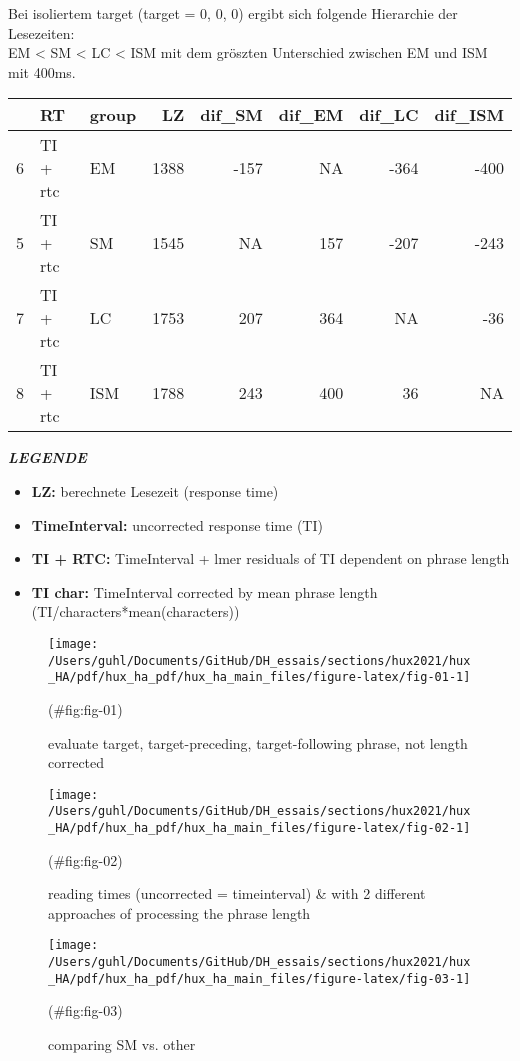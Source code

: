 \documentclass[
]{article}
\providecommand{\tightlist}{%
  \setlength{\itemsep}{0pt}\setlength{\parskip}{0pt}}
\begin{document}
Bei isoliertem target (target = 0, 0, 0) ergibt sich folgende Hierarchie der Lesezeiten:\\
EM \textless{} SM \textless{} LC \textless{} ISM mit dem gröszten Unterschied zwischen EM und ISM mit 400ms.

\begin{tabular}{l|l|l|r|r|r|r|r}
\hline
  & RT & group & LZ & dif\_SM & dif\_EM & dif\_LC & dif\_ISM\\
\hline
6 & TI + rtc & EM & 1388 & -157 & NA & -364 & -400\\
\hline
5 & TI + rtc & SM & 1545 & NA & 157 & -207 & -243\\
\hline
7 & TI + rtc & LC & 1753 & 207 & 364 & NA & -36\\
\hline
8 & TI + rtc & ISM & 1788 & 243 & 400 & 36 & NA\\
\hline
\end{tabular}

\textbf{\emph{LEGENDE}}

\begin{itemize}
\tightlist
\item
  \textbf{LZ:} berechnete Lesezeit (response time)
\item
  \textbf{TimeInterval:} uncorrected response time (TI)\\
\item
  \textbf{TI + RTC:} TimeInterval + lmer residuals of TI dependent on phrase length\\
\item
  \textbf{TI char:} TimeInterval corrected by mean phrase length (TI/characters*mean(characters))
\end{itemize}

\begin{figure}[H]
\texttt{[image: /Users/guhl/Documents/GitHub/DH\_essais/sections/hux2021/hux\_HA/pdf/hux\_ha\_pdf/hux\_ha\_main\_files/figure-latex/fig-01-1]} \caption{evaluate target, target-preceding, target-following phrase, not length corrected}(\#fig:fig-01)
\end{figure}

\begin{figure}[H]
\texttt{[image: /Users/guhl/Documents/GitHub/DH\_essais/sections/hux2021/hux\_HA/pdf/hux\_ha\_pdf/hux\_ha\_main\_files/figure-latex/fig-02-1]} \caption{reading times (uncorrected = timeinterval) & with 2 different approaches of processing the phrase length}(\#fig:fig-02)
\end{figure}

\begin{figure}[H]
\texttt{[image: /Users/guhl/Documents/GitHub/DH\_essais/sections/hux2021/hux\_HA/pdf/hux\_ha\_pdf/hux\_ha\_main\_files/figure-latex/fig-03-1]} \caption{comparing SM vs. other}(\#fig:fig-03)
\end{figure}
\end{document}

